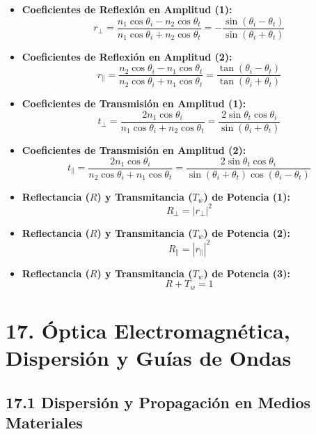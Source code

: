 \documentclass[11pt,a4paper]{article}
\begin{document}
\begin{itemize}
  \item \textbf{Coeficientes de Reflexión en Amplitud (1):}
  \[
    r_\perp = \frac{n_1 \cos\theta_i - n_2 \cos\theta_t}{n_1 \cos\theta_i + n_2 \cos\theta_t} = -\frac{\sin(\theta_i - \theta_t)}{\sin(\theta_i + \theta_t)}
  \]
  \item \textbf{Coeficientes de Reflexión en Amplitud (2):}
  \[
    r_\parallel = \frac{n_2 \cos\theta_i - n_1 \cos\theta_t}{n_2 \cos\theta_i + n_1 \cos\theta_t} = \frac{\tan(\theta_i - \theta_t)}{\tan(\theta_i + \theta_t)}
  \]
  \item \textbf{Coeficientes de Transmisión en Amplitud (1):}
  \[
    t_\perp = \frac{2 n_1 \cos\theta_i}{n_1 \cos\theta_i + n_2 \cos\theta_t} = \frac{2 \sin\theta_t \cos\theta_i}{\sin(\theta_i + \theta_t)}
  \]
  \item \textbf{Coeficientes de Transmisión en Amplitud (2):}
  \[
    t_\parallel = \frac{2 n_1 \cos\theta_i}{n_2 \cos\theta_i + n_1 \cos\theta_t} = \frac{2 \sin\theta_t \cos\theta_i}{\sin(\theta_i + \theta_t)\cos(\theta_i - \theta_t)}
  \]
  \item \textbf{Reflectancia ($R$) y Transmitancia ($T_w$) de Potencia (1):}
  \[
    R_\perp = |r_\perp|^2
  \]
  \item \textbf{Reflectancia ($R$) y Transmitancia ($T_w$) de Potencia (2):}
  \[
    R_\parallel = |r_\parallel|^2
  \]
  \item \textbf{Reflectancia ($R$) y Transmitancia ($T_w$) de Potencia (3):}
  \[
    R + T_w = 1
  \]
\end{itemize}

\section*{17. Óptica Electromagnética, Dispersión y Guías de Ondas}

\subsection*{17.1 Dispersión y Propagación en Medios Materiales}
\end{document}
